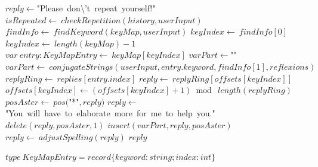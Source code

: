 \documentclass[a4paper,10pt]{article}
\begin{document}
\begin{algorithm}
\begin{algorithmic}[5]
      \STATE \(reply\gets\)"{}Please\ don\textbackslash{}'{}t\ repeat\ yourself!"{}\(\)
      \STATE \(isRepeated\gets\ checkRepetition(history,userInput)\)
        \STATE \(findInfo\gets\ findKeyword(keyMap,userInput)\)
        \STATE \(keyIndex\gets\ findInfo[0]\)
          \STATE \(keyIndex\gets\ length(keyMap)-1\)
        \ENDIF
        \STATE \(var\ entry:KeyMapEntry\gets\ keyMap[keyIndex]\)
        \STATE \(varPart\gets\)"{}"{}\(\)
          \STATE \(varPart\gets\ conjugateStrings(userInput,entry.keyword,findInfo[1],reflexions)\)
        \ENDIF
        \STATE \(replyRing\gets\ replies[entry.index]\)
        \STATE \(reply\gets\ replyRing[offsets[keyIndex]]\)
        \STATE \(offsets[keyIndex]\gets(offsets[keyIndex]+1)\bmod\ length(replyRing)\)
        \STATE \(posAster\gets\ pos(\)"{}*"{}\(,reply)\)
            \STATE \(reply\gets\)"{}You\ will\ have\ to\ elaborate\ more\ for\ me\ to\ help\ you."{}\(\)
          \ELSE
            \STATE \(delete(reply,posAster,1)\)
            \STATE \(insert(varPart,reply,posAster)\)
          \ENDIF
        \ENDIF
        \STATE \(reply\gets\ adjustSpelling(reply)\)
      \ENDIF
      \PRINT\(reply\)
    \ENDIF

\end{algorithmic}
\end{algorithm}


\begin{algorithm}
\caption{KeyMapEntry()}
\begin{algorithmic}[5]

\STATE {}
  \STATE \(type\ KeyMapEntry=record\{keyword:string;index:int\}\)

\end{algorithmic}
\end{algorithm}
\end{document}
